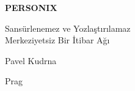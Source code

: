 \thispagestyle{empty}
\begin{center}
  {\sffamily\bfseries\fontsize{34}{40}\selectfont PERSONIX\par}
  \vspace{2.2em}
  {\rmfamily\large Sansürlenemez ve Yozlaştırılamaz\\[0.25em]
   Merkeziyetsiz Bir İtibar Ağı\par}
\end{center}
\begin{center}
  {\rmfamily\Large Pavel Kudrna\par}
  \vspace{0.45em}
  {\rmfamily\small Prag\quad\textbullet{}\par}
\end{center}
\clearpage
